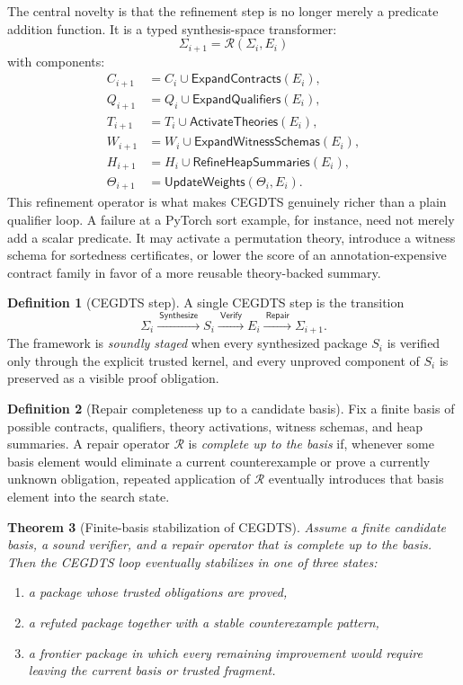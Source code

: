 \documentclass[11pt]{article}
\theoremstyle{definition}
\newtheorem{definition}{Definition}[section]
\theoremstyle{plain}
\newtheorem{theorem}[definition]{Theorem}
\begin{document}
The central novelty is that the refinement step is no longer merely a predicate
addition function. It is a typed synthesis-space transformer:
\[
\Sigma_{i+1} = \mathcal{R}(\Sigma_i, E_i)
\]
with components:
\begin{align*}
C_{i+1} &= C_i \cup \mathsf{ExpandContracts}(E_i), \\
Q_{i+1} &= Q_i \cup \mathsf{ExpandQualifiers}(E_i), \\
T_{i+1} &= T_i \cup \mathsf{ActivateTheories}(E_i), \\
W_{i+1} &= W_i \cup \mathsf{ExpandWitnessSchemas}(E_i), \\
H_{i+1} &= H_i \cup \mathsf{RefineHeapSummaries}(E_i), \\
\Theta_{i+1} &= \mathsf{UpdateWeights}(\Theta_i, E_i).
\end{align*}
This refinement operator is what makes \textsc{CEGDTS} genuinely richer than a
plain qualifier loop. A failure at a PyTorch sort example, for instance, need
not merely add a scalar predicate. It may activate a permutation theory,
introduce a witness schema for sortedness certificates, or lower the score of an
annotation-expensive contract family in favor of a more reusable theory-backed
summary.

\begin{definition}[\textsc{CEGDTS} step]
A single \textsc{CEGDTS} step is the transition
\[
\Sigma_i \xrightarrow{\ \mathsf{Synthesize}\ }
S_i \xrightarrow{\ \mathsf{Verify}\ }
E_i \xrightarrow{\ \mathsf{Repair}\ }
\Sigma_{i+1}.
\]
The framework is \emph{soundly staged} when every synthesized package $S_i$ is
verified only through the explicit trusted kernel, and every unproved component
of $S_i$ is preserved as a visible proof obligation.
\end{definition}

\begin{definition}[Repair completeness up to a candidate basis]
Fix a finite basis of possible contracts, qualifiers, theory activations,
witness schemas, and heap summaries. A repair operator $\mathcal{R}$ is
\emph{complete up to the basis} if, whenever some basis element would eliminate a
current counterexample or prove a currently unknown obligation, repeated
application of $\mathcal{R}$ eventually introduces that basis element into the
search state.
\end{definition}

\begin{theorem}[Finite-basis stabilization of \textsc{CEGDTS}]
Assume a finite candidate basis, a sound verifier, and a repair operator that is
complete up to the basis. Then the \textsc{CEGDTS} loop eventually stabilizes in
one of three states:
\begin{enumerate}[label=\arabic*.]
  \item a package whose trusted obligations are proved,
  \item a refuted package together with a stable counterexample pattern,
  \item a frontier package in which every remaining improvement would require
  leaving the current basis or trusted fragment.
\end{enumerate}
\end{theorem}
\end{document}
